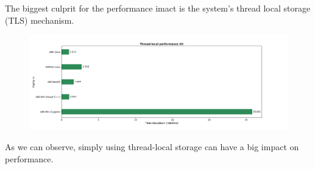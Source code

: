 The biggest culprit for the performance imact is the system's thread local storage (TLS)
mechanism.

\begin{figure}
\centering
\includegraphics[width=1\linewidth]{thread_local.png}
\label{fig:thread-local}
\end{figure}

As we can observe, simply using thread-local storage can have a big impact on performance.